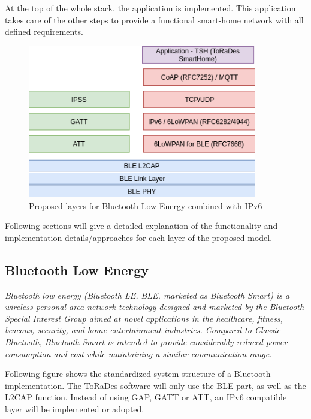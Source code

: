 \documentclass[]{scrreprt}%
\begin{document}
At the top of the whole stack, the application is implemented. This application takes care of the other steps to provide a functional smart-home network
with all defined requirements.

\begin{figure}[htb]
  \centering
  \includegraphics[width=100mm]{img/stack_ipv6-ble.png}
  \caption{Proposed layers for Bluetooth Low Energy combined with IPv6}
\end{figure}

Following sections will give a detailed explanation of the functionality and implementation details/approaches for each layer of the proposed model.

\pagebreak
\subsection{Bluetooth Low Energy}

\textit{Bluetooth low energy (Bluetooth LE, BLE, marketed as Bluetooth Smart) is a wireless personal area network technology designed 
and marketed by the Bluetooth Special Interest Group aimed at novel applications in the healthcare, fitness, beacons, security, 
and home entertainment industries. Compared to Classic Bluetooth, Bluetooth Smart is intended to provide considerably reduced power 
consumption and cost while maintaining a similar communication range.} \cite{WP01}

Following figure shows the standardized system structure of a Bluetooth implementation. The ToRaDes software will only use the BLE part, as well as the L2CAP
function. Instead of using GAP, GATT or ATT, an IPv6 compatible layer will be implemented or adopted.
\end{document}
